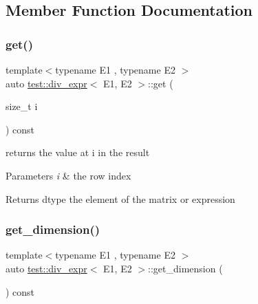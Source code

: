 \subsection{Member Function Documentation}
\mbox{\label{classtest_1_1div__expr_ace8d78b6843d8233525f767cd0096a74}} 
\subsubsection{\texorpdfstring{get()}{get()}}
{\footnotesize\ttfamily template$<$typename E1 , typename E2 $>$ \\
auto \mbox{\hyperlink{classtest_1_1div__expr}{test\+::div\+\_\+expr}}$<$ E1, E2 $>$\+::get (\begin{DoxyParamCaption}\item[{size\+\_\+t}]{i }\end{DoxyParamCaption}) const\hspace{0.3cm}{\ttfamily [inline]}}



returns the value at i in the result 


\begin{DoxyParams}{Parameters}
{\em i} & the row index \\
\hline
\end{DoxyParams}
\begin{DoxyReturn}{Returns}
dtype the element of the matrix or expression 
\end{DoxyReturn}
\mbox{\label{classtest_1_1div__expr_a8ef783b35224398db59e2b042917363e}} 
\subsubsection{\texorpdfstring{get\_dimension()}{get\_dimension()}}
{\footnotesize\ttfamily template$<$typename E1 , typename E2 $>$ \\
auto \mbox{\hyperlink{classtest_1_1div__expr}{test\+::div\+\_\+expr}}$<$ E1, E2 $>$\+::get\+\_\+dimension (\begin{DoxyParamCaption}{ }\end{DoxyParamCaption}) const\hspace{0.3cm}{\ttfamily [inline]}}



